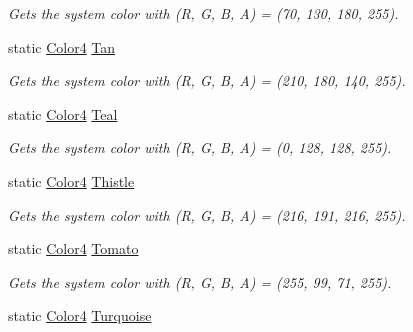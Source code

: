 \begin{DoxyCompactItemize}
\begin{DoxyCompactList}\small\item\em Gets the system color with (R, G, B, A) = (70, 130, 180, 255). \end{DoxyCompactList}\item 
static \hyperlink{struct_open_t_k_1_1_graphics_1_1_color4}{Color4} \hyperlink{struct_open_t_k_1_1_graphics_1_1_color4_a4b6af7db20547e600f27fdf4ab0960bc}{Tan}
\begin{DoxyCompactList}\small\item\em Gets the system color with (R, G, B, A) = (210, 180, 140, 255). \end{DoxyCompactList}\item 
static \hyperlink{struct_open_t_k_1_1_graphics_1_1_color4}{Color4} \hyperlink{struct_open_t_k_1_1_graphics_1_1_color4_a26f93d61d0f68ebcaf2e0750f3d0b4bc}{Teal}
\begin{DoxyCompactList}\small\item\em Gets the system color with (R, G, B, A) = (0, 128, 128, 255). \end{DoxyCompactList}\item 
static \hyperlink{struct_open_t_k_1_1_graphics_1_1_color4}{Color4} \hyperlink{struct_open_t_k_1_1_graphics_1_1_color4_ae84594b22b179dc42eb69d0252140af1}{Thistle}
\begin{DoxyCompactList}\small\item\em Gets the system color with (R, G, B, A) = (216, 191, 216, 255). \end{DoxyCompactList}\item 
static \hyperlink{struct_open_t_k_1_1_graphics_1_1_color4}{Color4} \hyperlink{struct_open_t_k_1_1_graphics_1_1_color4_a9c6426056debdfcf60226adddbe8d747}{Tomato}
\begin{DoxyCompactList}\small\item\em Gets the system color with (R, G, B, A) = (255, 99, 71, 255). \end{DoxyCompactList}\item 
static \hyperlink{struct_open_t_k_1_1_graphics_1_1_color4}{Color4} \hyperlink{struct_open_t_k_1_1_graphics_1_1_color4_a335ae3c1d6492511ac5192c53ef2bf17}{Turquoise}

\end{DoxyCompactItemize}
